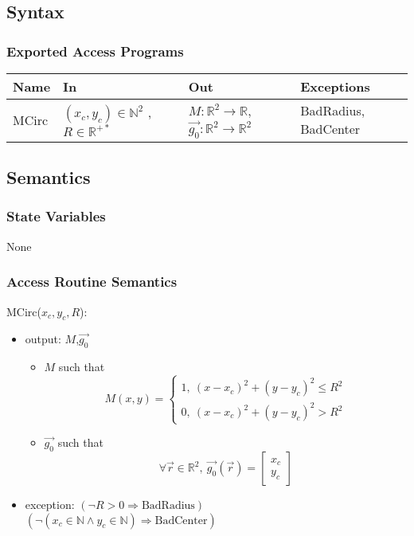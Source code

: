 \documentclass[12pt, titlepage]{article}
\begin{document}
\subsection{Syntax}

\subsubsection{Exported Access Programs}

\begin{center}
\begin{tabular}{p{2cm} p{4cm} p{4cm} p{2cm}}
\hline
\textbf{Name} & \textbf{In} & \textbf{Out} & \textbf{Exceptions} \\
\hline
MCirc & $(x_c,y_c) \in \mathbb{N}^2$ , $R \in \mathbb{R}^{+*}$ & $M:\mathbb{R}^2\rightarrow\mathbb{R}$, $\overrightarrow{g_0} :\mathbb{R}^2\rightarrow\mathbb{R}^2$ & BadRadius, BadCenter\\
\hline
\end{tabular}
\end{center}

\subsection{Semantics}

\subsubsection{State Variables}
None

\subsubsection{Access Routine Semantics}

\noindent MCirc($x_c,y_c,R$):
\begin{itemize} 
\item output: $M$,$\overrightarrow{g_0}$
	\begin{itemize}
	\item $M$ such that
	\begin{equation*}
	M(x,y)=\begin{cases}
	1, \ (x-x_c)^2+(y-y_c)^2\leq R^2 \\
	0, \ (x-x_c)^2+(y-y_c)^2> R^2
	\end{cases}
	\end{equation*}
	\item $\overrightarrow{g_0}$ such that
	\begin{equation*}
	\forall \vec{r} \in \mathbb{R}^2, \ \overrightarrow{g_0}(\vec{r})=\begin{bmatrix}
	x_c\\
	y_c
	\end{bmatrix}
	\end{equation*}
	\end{itemize}
\item exception:
\newline
$(\neg R>0 \Rightarrow \text{BadRadius})$\\
$(\neg (x_c \in \mathbb{N} \wedge y_c \in \mathbb{N}) \Rightarrow \text{BadCenter})$
\end{itemize}
\end{document}
